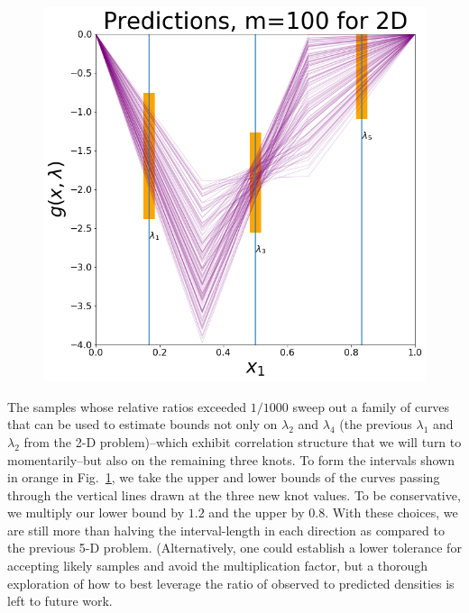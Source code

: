 \begin{figure}[htbp]
\centering
  \includegraphics[width=0.675\linewidth]{figures/pde-highd/pde-highd-alt_initial_D5_m100.png}
\caption{
}
\label{fig:pde-highd-5d-study}
\end{figure}

The samples whose relative ratios exceeded $1/1000$ sweep out a family of curves that can be used to estimate bounds not only on $\lambda_2$ and $\lambda_4$ (the previous $\lambda_1$ and $\lambda_2$ from the 2-D problem)\---which exhibit correlation structure that we will turn to momentarily\---but also on the remaining three knots.
To form the intervals shown in orange in Fig.~\ref{fig:pde-highd-5d-study}, we take the upper and lower bounds of the curves passing through the vertical lines drawn at the three new knot values.
To be conservative, we multiply our lower bound by $1.2$ and the upper by $0.8$.
With these choices, we are still more than halving the interval-length in each direction as compared to the previous 5-D problem.
(Alternatively, one could establish a lower tolerance for accepting likely samples and avoid the multiplication factor, but a thorough exploration of how to best leverage the ratio of observed to predicted densities is left to future work.


\FloatBarrier
